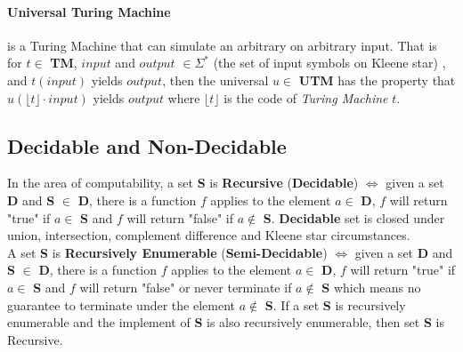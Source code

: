 \paragraph{Universal Turing Machine} is a Turing Machine that can simulate an arbitrary  on arbitrary input\cite{_universal_2016}. 
That is for $t \in$ \textbf{TM}, $input$ and $output$ $\in \Sigma^{*}$ (the set of input symbols on Kleene star\cite{jiraskova_kleene_2013}) , and $t(input)$ yields $output$, then the universal  $u\in$ \textbf{UTM} has the property that $u(\lfloor t\rfloor \cdot input)$ yields $output$ where $\lfloor t\rfloor$ is the code of \textit{Turing Machine} $t$.

\subsection{Decidable and Non-Decidable}
In the area of computability, a set \textbf{S} is \textbf{Recursive} (\textbf{Decidable}) $\iff$ given a set \textbf{D} and \textbf{S} $\in$ \textbf{D}, there is a function $f$ applies to the element $a \in$ \textbf{D},
$f$ will return "true" if $a \in$ \textbf{S} and $f$ will return "false" if $a \notin$ \textbf{S}\cite{jones_computability_1997}.
\textbf{Decidable} set is closed under union, intersection, complement difference and Kleene star\cite{_recursive_2015} circumstances.\\
A set \textbf{S} is \textbf{Recursively Enumerable} (\textbf{Semi-Decidable}) $\iff$ given a set \textbf{D} and \textbf{S} $\in$ \textbf{D}, there is a function $f$ applies to the element $a \in$ \textbf{D},
$f$ will return "true" if $a \in$ \textbf{S} and $f$ will return "false" or never terminate if $a \notin$ \textbf{S} which means no guarantee to terminate under the element $a \notin$ \textbf{S}\cite{jones_computability_1997}.
If a set \textbf{S} is recursively enumerable and the implement of \textbf{S} is also recursively enumerable, then set \textbf{S} is Recursive\cite{_recursively_2015}.

